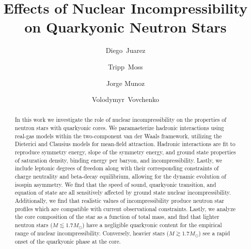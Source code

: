 \documentclass[twocolumn,floatfix,superscriptaddress,a4paper,showkeys,nofootinbib,reprint]{revtex4-1}
\begin{document}
\title{
Effects of Nuclear Incompressibility on Quarkyonic Neutron Stars
}

\author{Diego~Juarez}

\author{Tripp~Moss}

\author{Jorge Munoz}


\author{Volodymyr~Vovchenko}



\begin{abstract}

In this work we investigate the role of nuclear incompressibility on the properties of neutron stars with quarkyonic cores. We paramaeterize hadronic interactions using real-gas models within the two-component van der Waals framework, utilizing the Dieterici and Clausius models for mean-field attraction. Hadronic interactions are fit to reproduce symmetry energy, slope of the symmetry energy, and ground state properties of saturation density, binding energy per baryon, and incompressibility. Lastly, we include leptonic degrees of freedom along with their corresponding constraints of charge neutrality and beta-decay equilibrium, allowing for the dynamic evolution of isospin asymmetry. We find that the speed of sound, quarkyonic transition, and equation of state are all sensitively affected by ground state nuclear incompressibility. Additionally, we find that realistic values of incompressibility produce neutron star profiles which are compatible with current observational constraints. Lastly, we analyze the core composition of the star as a function of total mass, and find that lighter neutron stars ($M \lesssim 1.7M_{\odot}$) have a negligible quarkyonic content for the empirical range of nuclear incompressibility. Conversely, heavier stars ($M \gtrsim 1.7M_{\odot}$) see a rapid onset of the quarkyonic phase at the core.



\end{abstract}




\maketitle
\end{document}
